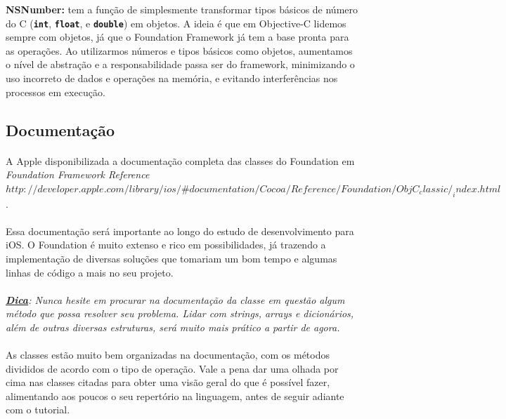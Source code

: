 \documentclass[a4paper,12pt,brazil,doubleside]{book}
\begin{document}
\begin{description}
\item{\textbf{NSNumber:} tem a função de simplesmente transformar tipos básicos de número do C (\texttt{\textbf{int}}, \texttt{\textbf{float}}, e \texttt{\textbf{double}}) em objetos. A ideia é que em Objective-C lidemos sempre com objetos, já que o Foundation Framework já tem a base pronta para as operações. Ao utilizarmos números e tipos básicos como objetos, aumentamos o nível de abstração e a responsabilidade passa ser do framework, minimizando o uso incorreto de dados e operações na memória, e evitando interferências nos processos em execução.}
\end{description}

\subsection{Documentação}

\paragraph{}A Apple disponibilizada a documentação completa das classes do Foundation em
\emph{Foundation Framework Reference\\ \(http://developer.apple.com/library/ios/\#documentation/Cocoa/Reference/Foundation/ObjC_classic/_index.html\)}.
\paragraph{}Essa documentação será importante ao longo do estudo de desenvolvimento para iOS. O Foundation é muito extenso e rico em possibilidades, já trazendo a implementação de diversas soluções que tomariam um bom tempo e algumas linhas de código a mais no seu projeto.
\paragraph{}\textit{\textbf{\underline{Dica}}: Nunca hesite em procurar na documentação da classe em questão algum método que possa resolver seu problema. Lidar com strings, arrays e dicionários, além de outras diversas estruturas, será muito mais prático a partir de agora.}
\paragraph{}As classes estão muito bem organizadas na documentação, com os métodos divididos de acordo com o tipo de operação. Vale a pena dar uma olhada por cima nas classes citadas para obter uma visão geral do que é possível fazer, alimentando aos poucos o seu repertório na linguagem, antes de seguir adiante com o tutorial.
\end{document}
